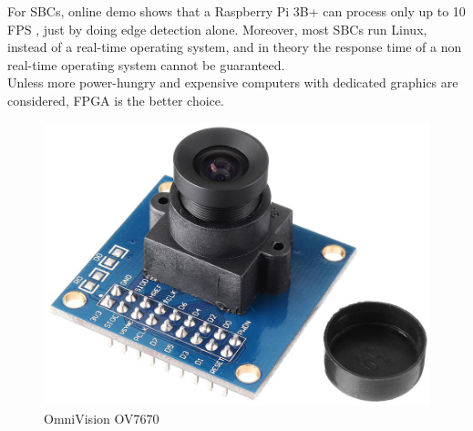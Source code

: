 \documentclass{article}
\begin{document}
	For SBCs, online demo shows that a Raspberry Pi 3B+ can process only up to 10 FPS \cite{rpi}, just by doing edge detection alone. Moreover, most SBCs run Linux, instead of a real-time operating system, and in theory the response time of a non real-time operating system cannot be guaranteed.
	\\
	
	Unless more power-hungry and expensive computers with dedicated graphics are considered, FPGA is the better choice.
	\begin{figure}[h]
		\centering
		\includegraphics[scale=0.2]{ov7670}
		\caption{OmniVision OV7670}
		\label{fig:ov7670}
	\end{figure}
	\\
	
\end{document}
